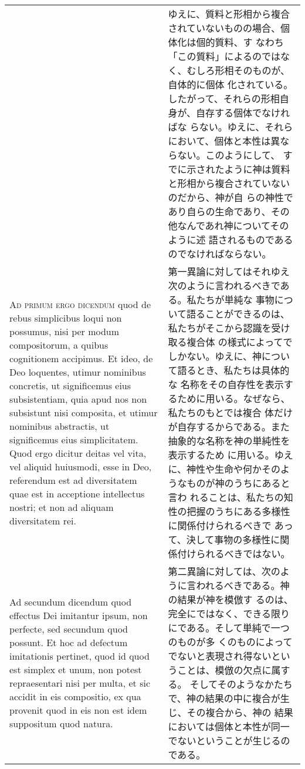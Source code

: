 \documentclass[10pt]{jsarticle}
\begin{document}
\begin{longtable}{p{21em}p{21em}}
&

ゆえに、質料と形相から複合されていないものの場合、個体化は個的質料、す
なわち「この質料」によるのではなく、むしろ形相そのものが、自体的に個体
化されている。したがって、それらの形相自身が、自存する個体でなければな
らない。ゆえに、それらにおいて、個体と本性は異ならない。このようにして、
すでに示されたように神は質料と形相から複合されていないのだから、神が自
らの神性であり自らの生命であり、その他なんであれ神についてそのように述
語されるものであるのでなければならない。

\\

\textsc{Ad primum ergo dicendum} quod de rebus simplicibus loqui non
possumus, nisi per modum compositorum, a quibus cognitionem accipimus.
Et ideo, de Deo loquentes, utimur nominibus concretis, ut significemus
eius subsistentiam, quia apud nos non subsistunt nisi composita, et
utimur nominibus abstractis, ut significemus eius simplicitatem.  Quod
ergo dicitur deitas vel vita, vel aliquid huiusmodi, esse in Deo,
referendum est ad diversitatem quae est in acceptione intellectus
nostri; et non ad aliquam diversitatem rei.

&

第一異論に対してはそれゆえ次のように言われるべきである。私たちが単純な
事物について語ることができるのは、私たちがそこから認識を受け取る複合体
の様式によってでしかない。ゆえに、神について語るとき、私たちは具体的な
名称をその自存性を表示するために用いる。なぜなら、私たちのもとでは複合
体だけが自存するからである。また抽象的な名称を神の単純性を表示するため
に用いる。ゆえに、神性や生命や何かそのようなものが神のうちにあると言わ
れることは、私たちの知性の把握のうちにある多様性に関係付けられるべきで
あって、決して事物の多様性に関係付けられるべきではない。

\\

Ad secundum dicendum quod effectus Dei imitantur ipsum, non perfecte,
sed secundum quod possunt. Et hoc ad defectum imitationis pertinet,
quod id quod est simplex et unum, non potest repraesentari nisi per
multa, et sic accidit in eis compositio, ex qua provenit quod in eis
non est idem suppositum quod natura.

&

第二異論に対しては、次のように言われるべきである。神の結果が神を模倣す
るのは、完全にではなく、できる限りにである。そして単純で一つのものが多
くのものによってでないと表現され得ないということは、模倣の欠点に属する。
そしてそのようなかたちで、神の結果の中に複合が生じ、その複合から、神の
結果においては個体と本性が同一でないということが生じるのである。


\end{longtable}
\end{document}
